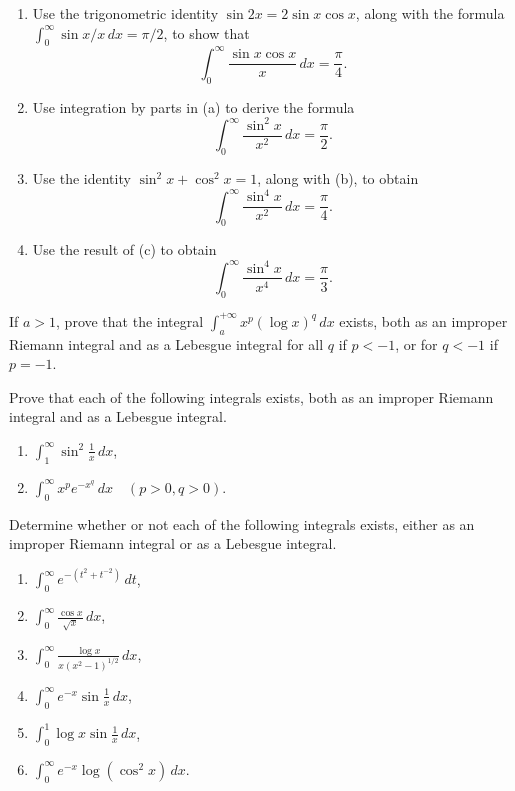 \begin{problembox}
\begin{enumerate}[label=(\alph*)]
    \item Use the trigonometric identity $\sin 2x = 2 \sin x \cos x$, along with the formula $\int_{0}^{\infty} \sin x/x \, dx = \pi/2$, to show that
    \[\int_{0}^{\infty} \frac{\sin x \cos x}{x} \, dx = \frac{\pi}{4}.\]
    \item Use integration by parts in (a) to derive the formula
    \[\int_{0}^{\infty} \frac{\sin^2 x}{x^2} \, dx = \frac{\pi}{2}.\]
    \item Use the identity $\sin^2 x + \cos^2 x = 1$, along with (b), to obtain
    \[\int_{0}^{\infty} \frac{\sin^4 x}{x^2} \, dx = \frac{\pi}{4}.\]
    \item Use the result of (c) to obtain
    \[\int_{0}^{\infty} \frac{\sin^4 x}{x^4} \, dx = \frac{\pi}{3}.\]
\end{enumerate}
\end{problembox}

\begin{problembox}
If $a > 1$, prove that the integral $\int_{a}^{+\infty} x^p (\log x)^q \, dx$ exists, both as an improper Riemann integral and as a Lebesgue integral for all $q$ if $p < -1$, or for $q < -1$ if $p = -1$.
\end{problembox}

\begin{problembox}
Prove that each of the following integrals exists, both as an improper Riemann integral and as a Lebesgue integral.
\begin{enumerate}[label=(\alph*)]
    \item $\int_{1}^{\infty} \sin^2 \frac{1}{x} \, dx$,
    \item $\int_{0}^{\infty} x^pe^{-x^q} \, dx \quad (p > 0, q > 0)$.
\end{enumerate}
\end{problembox}

\begin{problembox}
Determine whether or not each of the following integrals exists, either as an improper Riemann integral or as a Lebesgue integral.
\begin{enumerate}[label=(\alph*)]
    \item $\int_{0}^{\infty} e^{-(t^2 + t^{-2})} \, dt$,
    \item $\int_{0}^{\infty} \frac{\cos x}{\sqrt{x}} \, dx$,
    \item $\int_{0}^{\infty} \frac{\log x}{x(x^2 - 1)^{1/2}} \, dx$,
    \item $\int_{0}^{\infty} e^{-x} \sin \frac{1}{x} \, dx$,
    \item $\int_{0}^{1} \log x \sin \frac{1}{x} \, dx$,
    \item $\int_{0}^{\infty} e^{-x} \log (\cos^2 x) \, dx$.
\end{enumerate}
\end{problembox}

